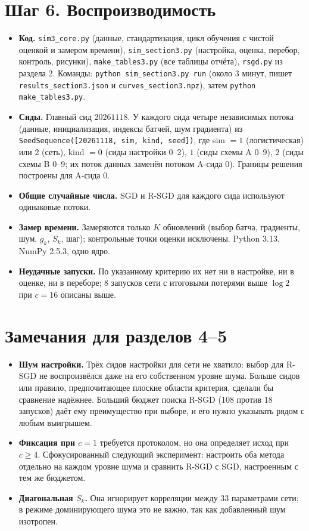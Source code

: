 \documentclass[11pt,a4paper]{article}
\begin{document}
\section*{Шаг 6. Воспроизводимость}

\begin{itemize}
\item \textbf{Код.} \texttt{sim3\_core.py} (данные, стандартизация, цикл обучения с чистой
оценкой и замером времени), \texttt{sim\_section3.py} (настройка, оценка, перебор, контроль,
рисунки), \texttt{make\_tables3.py} (все таблицы отчёта), \texttt{rsgd.py} из раздела 2. Команды:
\texttt{python sim\_section3.py run} (около 3 минут, пишет \texttt{results\_section3.json} и
\texttt{curves\_section3.npz}), затем \texttt{python make\_tables3.py}.
\item \textbf{Сиды.} Главный сид $20261118$. У каждого сида четыре независимых потока (данные,
инициализация, индексы батчей, шум градиента) из
\texttt{SeedSequence([20261118, sim, kind, seed])}, где sim $=1$ (логистическая) или $2$ (сеть),
kind $=0$ (сиды настройки 0--2), $1$ (сиды схемы A 0--9), $2$ (сиды схемы B 0--9; их поток данных
заменён потоком A-сида 0). Границы решения построены для A-сида 0.
\item \textbf{Общие случайные числа.} SGD и R-SGD для каждого сида используют одинаковые потоки.
\item \textbf{Замер времени.} Замеряются только $K$ обновлений (выбор батча, градиенты, шум,
$g_k$, $S_k$, шаг); контрольные точки оценки исключены. Python 3.13, NumPy 2.5.3, одно ядро.
\item \textbf{Неудачные запуски.} По указанному критерию их нет ни в настройке, ни в оценке, ни
в переборе; 8 запусков сети с итоговыми потерями выше $\log2$ при $c=16$ описаны выше.
\end{itemize}

\section*{Замечания для разделов 4--5}

\begin{itemize}
\item \textbf{Шум настройки.} Трёх сидов настройки для сети не хватило: выбор для R-SGD не
воспроизвёлся даже на его собственном уровне шума. Больше сидов или правило, предпочитающее
плоские области критерия, сделали бы сравнение надёжнее. Больший бюджет поиска R-SGD (108 против
18 запусков) даёт ему преимущество при выборе, и его нужно указывать рядом с любым выигрышем.
\item \textbf{Фиксация при $c=1$} требуется протоколом, но она определяет исход при $c\ge4$.
Сфокусированный следующий эксперимент: настроить оба метода отдельно на каждом уровне шума и
сравнить R-SGD с SGD, настроенным с тем же бюджетом.
\item \textbf{Диагональная $S_k$.} Она игнорирует корреляции между 33 параметрами сети; в
режиме доминирующего шума это не важно, так как добавленный шум изотропен.
\end{itemize}
\end{document}
